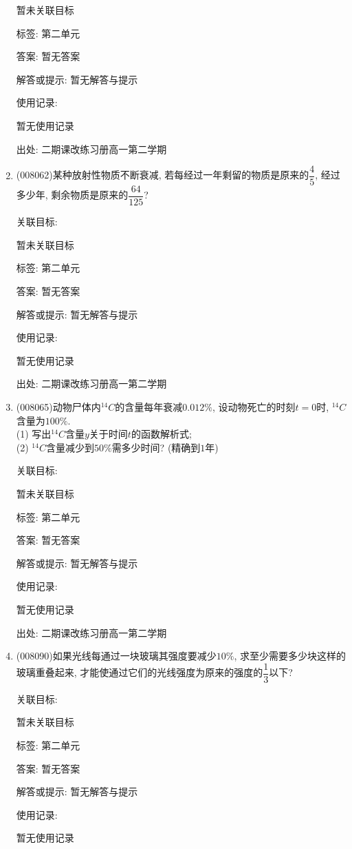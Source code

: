 \documentclass[10pt,a4paper]{article}
\begin{document}
\begin{enumerate}[1.]
暂未关联目标



标签: 第二单元

答案: 暂无答案

解答或提示: 暂无解答与提示

使用记录:

暂无使用记录


出处: 二期课改练习册高一第二学期
\item { (008062)}某种放射性物质不断衰减, 若每经过一年剩留的物质是原来的$\dfrac 45$, 经过多少年, 剩余物质是原来的$\dfrac{64}{125}$?


关联目标:

暂未关联目标



标签: 第二单元

答案: 暂无答案

解答或提示: 暂无解答与提示

使用记录:

暂无使用记录


出处: 二期课改练习册高一第二学期
\item { (008065)}动物尸体内$^{14}C$的含量每年衰减$0.012\%$, 设动物死亡的时刻$t=0$时, $^{14}C$含量为$100\%$.\\
(1) 写出$^{14}C$含量$y$关于时间$t$的函数解析式;\\
(2) $^{14}C$含量减少到$50\%$需多少时间? (精确到$1$年)


关联目标:

暂未关联目标



标签: 第二单元

答案: 暂无答案

解答或提示: 暂无解答与提示

使用记录:

暂无使用记录


出处: 二期课改练习册高一第二学期
\item { (008090)}如果光线每通过一块玻璃其强度要减少$10\%$, 求至少需要多少块这样的玻璃重叠起来, 才能使通过它们的光线强度为原来的强度的$\dfrac 13$以下?


关联目标:

暂未关联目标



标签: 第二单元

答案: 暂无答案

解答或提示: 暂无解答与提示

使用记录:

暂无使用记录



\end{enumerate}
\end{document}
